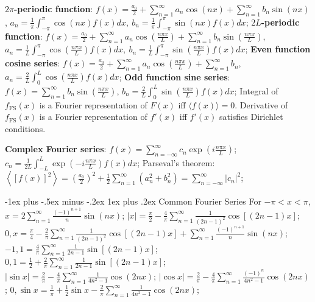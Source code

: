 \documentclass[10pt,landscape]{article}
\makeatletter
\renewcommand{\subsubsection}{\@startsection{subsubsection}{3}{0mm}%
                                {-1ex plus -.5ex minus -.2ex}%
                                {1ex plus .2ex}%
                                {\normalfont\small\bfseries}}
\makeatother
\begin{document}
\begin{multicols}{3}
\textbf{$2\pi$-periodic function}: $f(x) = \frac{a_0}{2} + \sum_{n=1}^\infty a_n \cos(nx)
	+ \sum_{n=1}^\infty b_n \sin(nx)$,
$a_n = \frac{1}{\pi} \int_{-\pi}^\pi \cos(nx) f(x) dx,\ 
	b_n = \frac{1}{\pi} \int_{-\pi}^\pi \sin(nx) f(x) dx$;
\textbf{$2L$-periodic function}: $f(x) = \frac{a_0}{2} + \sum_{n=1}^\infty a_n
	\cos \left( \frac{n\pi x}{L} \right) + \sum_{n=1}^\infty b_n 
	\sin \left( \frac{n\pi x}{L} \right)$,
$a_n = \frac{1}{L} \int_{-\pi}^\pi \cos \left( \frac{n\pi x}{L} \right) f(x) dx,\ 
	b_n = \frac{1}{L} \int_{-\pi}^\pi \sin \left( \frac{n\pi x}{L} \right) f(x) dx$;
\textbf{Even function cosine series}:
$f(x) = \frac{a_0}{2} + \sum_{n=1}^\infty a_n
	\cos \left( \frac{n\pi x}{L} \right) + \sum_{n=1}^\infty b_n$,
$a_n = \frac{2}{L} \int_0^L \cos \left( \frac{n\pi x}{L} \right) f(x) dx$;
\textbf{Odd function sine series}:
$f(x) = \sum_{n=1}^\infty b_n \sin \left( \frac{n\pi x}{L} \right)$,
$b_n = \frac{2}{L} \int_0^L \sin \left( \frac{n\pi x}{L} \right) f(x) dx$;
Integral of $f_{\text{FS}}(x)$ is a Fourier representation of $F(x)$ iff 
	$\langle f(x) \rangle = 0$.
Derivative of $f_{\text{FS}}(x)$ is a Fourier representation of $f'(x)$ iff 
	$f'(x)$ satisfies Dirichlet conditions.

\textbf{Complex Fourier series}:
$f(x) = \sum_{n=-\infty}^\infty c_n \exp \left( i\frac{n\pi x}{L} \right)$;
$c_n = \frac{1}{2L} \int_{-L}^L \exp \left( -i\frac{n\pi x}{L} \right) f(x) dx$;
Parseval's theorem:
	$\left\langle [f(x)]^2 \right\rangle
	= \left( \frac{a_0}{2} \right)^2 + \frac{1}{2} \sum_{n=1}^\infty (a_n^2 + b_n^2)
	= \sum_{n=-\infty}^\infty |c_n|^2$;

\subsubsection{Common Fourier Series}
For $-\pi < x < \pi$,
$x = 2 \sum_{n=1}^\infty \frac{(-1)^{n+1}}{n} \sin (nx)$;
$|x| = \frac{\pi}{2} - \frac{4}{\pi} \sum_{n=1}^\infty \frac{1}{(2n-1)^2} \cos
	[(2n-1)x]$; 
$0, x = \frac{\pi}{4} - \frac{2}{\pi} \sum_{n=1}^\infty \frac{1}{(2n-1)^2} \cos
	[(2n-1)x] + \sum_{n=1}^\infty \frac{(-1)^{n+1}}{n} \sin (nx)$;
$-1, 1 = \frac{4}{\pi} \sum_{n=1}^\infty \frac{1}{2n-1} \sin [(2n-1)x]$;
$0, 1 = \frac{1}{2} + \frac{2}{\pi} \sum_{n=1}^\infty \frac{1}{2n-1} \sin [(2n-1)x]$;
$|\sin x| = \frac{2}{\pi} - \frac{4}{\pi} \sum_{n=1}^\infty \frac{1}{4n^2-1}
	\cos (2nx)$;
$|\cos x| = \frac{2}{\pi} - \frac{4}{\pi} \sum_{n=1}^\infty
	\frac{(-1)^n}{4n^2-1} \cos (2nx)$;
$0, \sin x = \frac{1}{\pi} + \frac{1}{2} \sin x- \frac{2}{\pi}
	\sum_{n=1}^\infty \frac{1}{4n^2-1} \cos (2nx)$;


\end{multicols}
\end{document}
